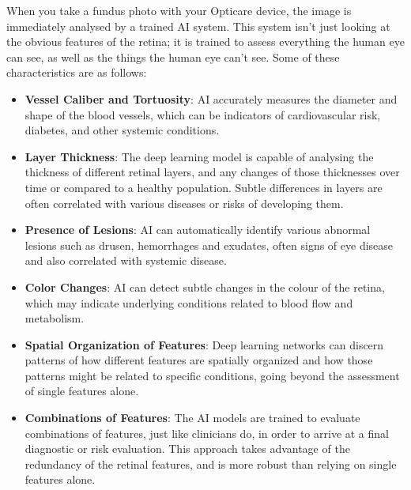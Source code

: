 \documentclass[
  Letterpaper,
]{scrbook}
\providecommand{\tightlist}{%
  \setlength{\itemsep}{0pt}\setlength{\parskip}{0pt}}\usepackage{longtable,booktabs,array}
\begin{document}
When you take a fundus photo with your Opticare device, the image is
immediately analysed by a trained AI system. This system isn't just
looking at the obvious features of the retina; it is trained to assess
everything the human eye can see, as well as the things the human eye
can't see. Some of these characteristics are as follows:

\begin{itemize}
\tightlist
\item
  \textbf{Vessel Caliber and Tortuosity}: AI accurately measures the
  diameter and shape of the blood vessels, which can be indicators of
  cardiovascular risk, diabetes, and other systemic conditions.
\item
  \textbf{Layer Thickness}: The deep learning model is capable of
  analysing the thickness of different retinal layers, and any changes
  of those thicknesses over time or compared to a healthy population.
  Subtle differences in layers are often correlated with various
  diseases or risks of developing them.
\item
  \textbf{Presence of Lesions}: AI can automatically identify various
  abnormal lesions such as drusen, hemorrhages and exudates, often signs
  of eye disease and also correlated with systemic disease.
\item
  \textbf{Color Changes}: AI can detect subtle changes in the colour of
  the retina, which may indicate underlying conditions related to blood
  flow and metabolism.
\item
  \textbf{Spatial Organization of Features}: Deep learning networks can
  discern patterns of how different features are spatially organized and
  how those patterns might be related to specific conditions, going
  beyond the assessment of single features alone.
\item
  \textbf{Combinations of Features}: The AI models are trained to
  evaluate combinations of features, just like clinicians do, in order
  to arrive at a final diagnostic or risk evaluation. This approach
  takes advantage of the redundancy of the retinal features, and is more
  robust than relying on single features alone.
\end{itemize}
\end{document}
